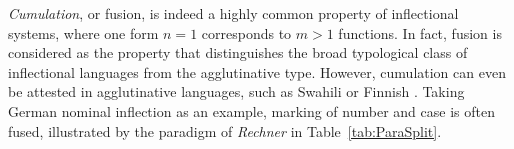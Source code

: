 \documentclass[output=paper]{langscibook}
\begin{document}
\emph{Cumulation}, or fusion, is indeed a highly common property of
inflectional systems, where one form $n=1$ corresponds to $m>1$
functions. In fact, fusion is considered as the property that
distinguishes the broad typological class of inflectional languages
from the agglutinative type. However, cumulation can even be attested
in agglutinative languages, such as Swahili \citep{Stump93} or Finnish
\citep{Spencer:03:Morphology}.  Taking German nominal inflection as an
example, marking of number and case is often fused, illustrated by the
paradigm of \textit{Rechner} in Table~\ref{tab:ParaSplit}.

\begin{table}[htb]
  \centering
  
  
\end{table}
\end{document}
